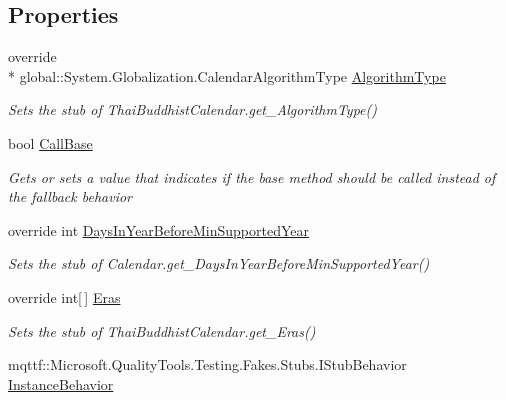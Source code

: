 \subsection*{Properties}
\begin{DoxyCompactItemize}
\item 
override \\*
global\-::\-System.\-Globalization.\-Calendar\-Algorithm\-Type \hyperlink{class_system_1_1_globalization_1_1_fakes_1_1_stub_thai_buddhist_calendar_a44c97f2be82fd6e8fc902fa0caa0e489}{Algorithm\-Type}
\begin{DoxyCompactList}\small\item\em Sets the stub of Thai\-Buddhist\-Calendar.\-get\-\_\-\-Algorithm\-Type()\end{DoxyCompactList}\item 
bool \hyperlink{class_system_1_1_globalization_1_1_fakes_1_1_stub_thai_buddhist_calendar_a5bad612c3d8fc5d4f3395f86e306eaed}{Call\-Base}
\begin{DoxyCompactList}\small\item\em Gets or sets a value that indicates if the base method should be called instead of the fallback behavior\end{DoxyCompactList}\item 
override int \hyperlink{class_system_1_1_globalization_1_1_fakes_1_1_stub_thai_buddhist_calendar_a710cf87f9aa47a7d4f6fa7af425230fd}{Days\-In\-Year\-Before\-Min\-Supported\-Year}
\begin{DoxyCompactList}\small\item\em Sets the stub of Calendar.\-get\-\_\-\-Days\-In\-Year\-Before\-Min\-Supported\-Year()\end{DoxyCompactList}\item 
override int\mbox{[}$\,$\mbox{]} \hyperlink{class_system_1_1_globalization_1_1_fakes_1_1_stub_thai_buddhist_calendar_a5f2c2eab5341ca86ff7aba13b07c160d}{Eras}
\begin{DoxyCompactList}\small\item\em Sets the stub of Thai\-Buddhist\-Calendar.\-get\-\_\-\-Eras()\end{DoxyCompactList}\item 
mqttf\-::\-Microsoft.\-Quality\-Tools.\-Testing.\-Fakes.\-Stubs.\-I\-Stub\-Behavior \hyperlink{class_system_1_1_globalization_1_1_fakes_1_1_stub_thai_buddhist_calendar_a726a49d299bc7e23bf8289c5e77c9d1a}{Instance\-Behavior}

\end{DoxyCompactItemize}
